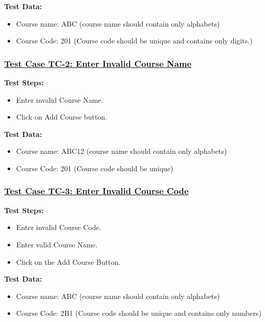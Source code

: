 \textbf{Test Data:}
\begin{itemize}

\item Course name: ABC (course name should contain only alphabets)
\item Course Code: 201 (Course code should be unique and contains only digits.)

\end{itemize}

\subsubsection{\underline{Test Case TC-2: Enter Invalid Course Name}}
\textbf{Test Steps:}
\begin{itemize}

\item Enter invalid Course Name.
\item Click on Add Course button.

\end{itemize}

\textbf{Test Data:}
\begin{itemize}

\item Course name: ABC12 (course name should contain only alphabets)
\item Course Code: 201 (Course code should be unique)

\end{itemize}

\subsubsection{\underline{Test Case TC-3: Enter Invalid Course Code}}
\textbf{Test Steps:}
\begin{itemize}

\item Enter invalid Course Code.
\item Enter valid Course Name.
\item Click on the Add Course Button.

\end{itemize}

\textbf{Test Data:}
\begin{itemize}

\item Course name: ABC (course name should contain only alphabets)
\item Course Code: 2B1 (Course code should be unique and contains only numbers)

\end{itemize}

